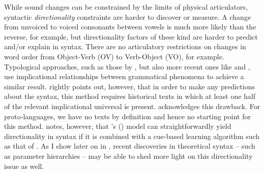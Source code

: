 \documentclass[output=paper,colorlinks,citecolor=brown]{langscibook}
\begin{document}
While sound changes can be constrained by the limits of physical articulators, syntactic \emph{directionality} constraints are harder to discover or measure. A change from unvoiced to voiced consonants between vowels is much more likely than the reverse, for example, but directionality factors of these kind are harder to predict and/or explain in syntax. There are no articulatory restrictions on changes in word order from Object-Verb (OV) to Verb-Object (VO), for example. Typological approaches, such as those by \citet{mm:greenberg_universals_1963, mm:lehmann_proto-indo-european_1974, mm:friedrich_proto-indo-european_1975-1, mm:miller_indo-european_1975}, but also more recent ones like \citet{mm:von_mengden_reconstructing_2008} and \citet{mm:ferraresi_principles_2008}, use implicational relationships between grammatical phenomena to achieve a similar result. \citet{mm:walkden_comparative_2009} rightly points out, however, that in order to make any predictions about the syntax, this method requires historical texts in which at least one half of the relevant implicational universal is present. \citet[109]{mm:von_mengden_reconstructing_2008} acknowledges this drawback. For proto-languages, we have no texts by definition and hence no starting point for this method. \citet[65]{mm:Walkden2014} notes, however, that \citeauthor{mm:niyogi_proper_2009}'s (\citeyear[101--127]{mm:niyogi_proper_2009}) model can straightforwardly yield directionality in syntax if it is combined with a cue-based learning algorithm such as that of \citet{mm:lightfoot_development_1999}.  As I show later on in , recent discoveries in theoretical syntax -- such as parameter hierarchies -- may be able to shed more light on this directionality issue as well.
\end{document}
